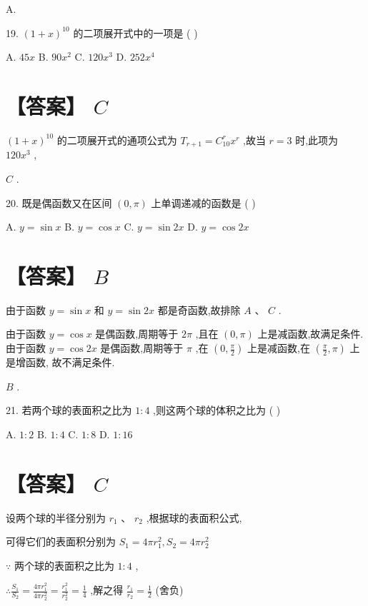 \documentclass[10pt]{article}
\begin{document}
A.

19. \({\left( 1 + x\right) }^{10}\) 的二项展开式中的一项是 ( )

A. \({45x}\) B. \({90}{x}^{2}\) C. \({120}{x}^{3}\) D. \({252}{x}^{4}\)

\section*{【答案】 \(C\)}

\({\left( 1 + x\right) }^{10}\) 的二项展开式的通项公式为 \({T}_{r + 1} = {C}_{10}^{r}{x}^{r}\) ,故当 \(r = 3\) 时,此项为 \({120}{x}^{3}\) ,

\(C\) .

20. 既是偶函数又在区间 \(\left( {0,\pi }\right)\) 上单调递减的函数是 ( )

A. \(y = \sin x\) B. \(y = \cos x\) C. \(y = \sin {2x}\) D. \(y = \cos {2x}\)

\section*{【答案】 \(B\)}

由于函数 \(y = \sin x\) 和 \(y = \sin {2x}\) 都是奇函数,故排除 \(A\text{ 、 }C\) .

由于函数 \(y = \cos x\) 是偶函数,周期等于 \({2\pi }\) ,且在 \(\left( {0,\pi }\right)\) 上是减函数,故满足条件. 由于函数 \(y = \cos {2x}\) 是偶函数,周期等于 \(\pi\) ,在 \(\left( {0,\frac{\pi }{2}}\right)\) 上是减函数,在 \(\left( {\frac{\pi }{2},\pi }\right)\) 上是增函数, 故不满足条件.

\(B\) .

21. 若两个球的表面积之比为 \(1 : 4\) ,则这两个球的体积之比为 ( )

A. \(1 : 2\) B. \(1 : 4\) C. \(1 : 8\) D. \(1 : {16}\)

\section*{【答案】 \(C\)}

设两个球的半径分别为 \({r}_{1}\text{ 、 }{r}_{2}\) ,根据球的表面积公式,

可得它们的表面积分别为 \({S}_{1} = {4\pi }{r}_{1}^{2},{S}_{2} = {4\pi }{r}_{2}^{2}\)

\(\because\) 两个球的表面积之比为 \(1 : 4\) ,

\(\therefore \frac{{S}_{1}}{{S}_{2}} = \frac{{4\pi }{r}_{1}^{2}}{{4\pi }{r}_{2}^{2}} = \frac{{r}_{1}^{2}}{{r}_{2}^{2}} = \frac{1}{4}\) ,解之得 \(\frac{{r}_{1}}{{r}_{2}} = \frac{1}{2}\) (舍负)
\end{document}

